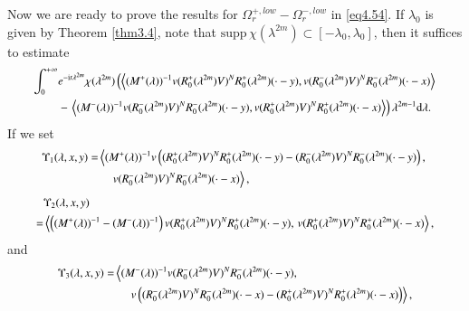 \documentclass[11pt,reqno]{amsart}
\def\d{{\rm d}}
\def\i{{\rm i}}
\numberwithin{equation}{section}
\theoremstyle{definition}
\begin{document}
Now we are ready to prove the results for $\Omega_{r}^{+, low}-\Omega_{r}^{-, low}$ in \eqref{eq4.54}. If $\lambda_0$ is given by Theorem \ref{thm3.4}, note that $\mathrm{supp}\,\chi(\lambda^{2m})\subset[-\lambda_0,\lambda_0]$, then it suffices to estimate
\begin{equation}\label{eq4.64}\small
\begin{aligned}
	\int_{0}^{+\infty}&e^{-\i t\lambda^{2m}}\chi(\lambda^{2m})\left( \left\langle  (M^+(\lambda))^{-1}v(R_{0}^{+}(\lambda^{2m})V)^{N}R_{0}^{+}(\lambda^{2m})(\cdot-y),
	v(R_{0}^{-}(\lambda^{2m})V)^{N}R_{0}^{-}(\lambda^{2m})(\cdot-x)\right\rangle\right.  \\
	&-\left. \left\langle (M^-(\lambda))^{-1}v(R_{0}^{-}(\lambda^{2m})V)^{N}R_{0}^{-}(\lambda^{2m})(\cdot-y),
	v(R_{0}^{+}(\lambda^{2m})V)^{N}R_{0}^{+}(\lambda^{2m})(\cdot-x)\right\rangle\right)\lambda^{2m-1}
	\d\lambda.
\end{aligned}
\end{equation}
If we set
\begin{equation*}\small
\begin{aligned}
	\Upsilon_{1}(\lambda,x,y)=&
	\left\langle(M^+(\lambda))^{-1}
	v\left( (R_{0}^{+}(\lambda^{2m})V)^{N}R_{0}^{+}(\lambda^{2m})(\cdot-y)
	-(R_{0}^{-}(\lambda^{2m})V)^{N}R_{0}^{-}(\lambda^{2m})(\cdot-y)\right) ,\right.\\
	&\quad\left. v(R_{0}^{-}(\lambda^{2m})V)^{N}R_{0}^{-}(\lambda^{2m})(\cdot-x)\right\rangle,
\end{aligned}
\end{equation*}		
\begin{equation*}\small
\begin{aligned}
	&\Upsilon_2(\lambda,x,y)\\
	=&\left\langle\left( (M^+(\lambda))^{-1}-(M^-(\lambda))^{-1}\right) v(R_{0}^{+}(\lambda^{2m})V)^{N}R_{0}^{+}(\lambda^{2m})(\cdot-y),
	\, v(R_{0}^{+}(\lambda^{2m})V)^{N}R_{0}^{+}(\lambda^{2m})(\cdot-x)\right\rangle,
\end{aligned}
\end{equation*}
and	
\begin{equation*}\small
\begin{aligned}
	\Upsilon_{3}(\lambda,x,y)=&\left\langle (M^-(\lambda))^{-1}
	v(R_{0}^{-}(\lambda^{2m})V)^{N}R_{0}^{-}(\lambda^{2m})(\cdot-y),\right. \\
	&\quad\left.\,v\left( (R_{0}^{-}(\lambda^{2m})V)^{N}R_{0}^{-}(\lambda^{2m})(\cdot-x)-(R_{0}^{+}(\lambda^{2m})V)^{N}R_{0}^{+}(\lambda^{2m})(\cdot-x)\right) \right\rangle,
\end{aligned}
\end{equation*}
\end{document}
